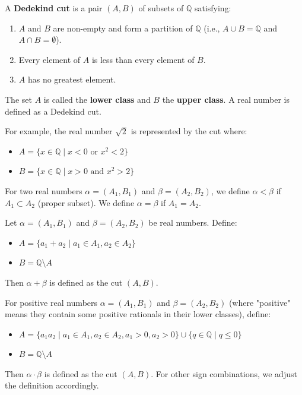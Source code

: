 \documentclass[oneside]{book}
\begin{document}
\begin{definition}
A \textbf{Dedekind cut} is a pair $(A, B)$ of subsets of $\mathbb{Q}$ satisfying:
\begin{enumerate}
    \item $A$ and $B$ are non-empty and form a partition of $\mathbb{Q}$ (i.e., $A \cup B = \mathbb{Q}$ and $A \cap B = \emptyset$).
    \item Every element of $A$ is less than every element of $B$.
    \item $A$ has no greatest element.
\end{enumerate}
The set $A$ is called the \textbf{lower class} and $B$ the \textbf{upper class}. A real number is defined as a Dedekind cut.
\end{definition}

For example, the real number $\sqrt{2}$ is represented by the cut where:
\begin{itemize}
    \item $A = \{x \in \mathbb{Q} \mid x < 0 \text{ or } x^2 < 2\}$
    \item $B = \{x \in \mathbb{Q} \mid x > 0 \text{ and } x^2 > 2\}$
\end{itemize}

\begin{definition}
For two real numbers $\alpha = (A_1, B_1)$ and $\beta = (A_2, B_2)$, we define $\alpha < \beta$ if $A_1 \subset A_2$ (proper subset). We define $\alpha = \beta$ if $A_1 = A_2$.
\end{definition}

\begin{definition}
Let $\alpha = (A_1, B_1)$ and $\beta = (A_2, B_2)$ be real numbers. Define:
\begin{itemize}
    \item $A = \{a_1 + a_2 \mid a_1 \in A_1, a_2 \in A_2\}$
    \item $B = \mathbb{Q} \setminus A$
\end{itemize}
Then $\alpha + \beta$ is defined as the cut $(A, B)$.
\end{definition}

\begin{definition}
For positive real numbers $\alpha = (A_1, B_1)$ and $\beta = (A_2, B_2)$ (where "positive" means they contain some positive rationals in their lower classes), define:
\begin{itemize}
    \item $A = \{a_1a_2 \mid a_1 \in A_1, a_2 \in A_2, a_1 > 0, a_2 > 0\} \cup \{q \in \mathbb{Q} \mid q \le 0\}$
    \item $B = \mathbb{Q} \setminus A$
\end{itemize}
Then $\alpha \cdot \beta$ is defined as the cut $(A, B)$. For other sign combinations, we adjust the definition accordingly.
\end{definition}
\end{document}
